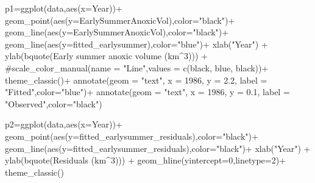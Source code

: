 \documentclass[
  letterpaper,
  DIV=11,
  numbers=noendperiod]{scrartcl}
\newenvironment{Shaded}{\begin{snugshade}}{\end{snugshade}}
\newcommand{\AttributeTok}[1]{\textcolor[rgb]{0.40,0.45,0.13}{#1}}
\newcommand{\CommentTok}[1]{\textcolor[rgb]{0.37,0.37,0.37}{#1}}
\newcommand{\DecValTok}[1]{\textcolor[rgb]{0.68,0.00,0.00}{#1}}
\newcommand{\FloatTok}[1]{\textcolor[rgb]{0.68,0.00,0.00}{#1}}
\newcommand{\FunctionTok}[1]{\textcolor[rgb]{0.28,0.35,0.67}{#1}}
\newcommand{\NormalTok}[1]{\textcolor[rgb]{0.00,0.23,0.31}{#1}}
\newcommand{\OtherTok}[1]{\textcolor[rgb]{0.00,0.23,0.31}{#1}}
\newcommand{\SpecialCharTok}[1]{\textcolor[rgb]{0.37,0.37,0.37}{#1}}
\newcommand{\StringTok}[1]{\textcolor[rgb]{0.13,0.47,0.30}{#1}}
\begin{document}
\begin{Shaded}
\begin{Highlighting}[]
\NormalTok{p1}\OtherTok{=}\FunctionTok{ggplot}\NormalTok{(data,}\FunctionTok{aes}\NormalTok{(}\AttributeTok{x=}\NormalTok{Year))}\SpecialCharTok{+}
  \FunctionTok{geom\_point}\NormalTok{(}\FunctionTok{aes}\NormalTok{(}\AttributeTok{y=}\NormalTok{EarlySummerAnoxicVol),}\AttributeTok{color=}\StringTok{"black"}\NormalTok{)}\SpecialCharTok{+}
  \FunctionTok{geom\_line}\NormalTok{(}\FunctionTok{aes}\NormalTok{(}\AttributeTok{y=}\NormalTok{EarlySummerAnoxicVol),}\AttributeTok{color=}\StringTok{"black"}\NormalTok{)}\SpecialCharTok{+}
  \FunctionTok{geom\_line}\NormalTok{(}\FunctionTok{aes}\NormalTok{(}\AttributeTok{y=}\NormalTok{fitted\_earlysummer),}\AttributeTok{color=}\StringTok{"blue"}\NormalTok{)}\SpecialCharTok{+}
  \FunctionTok{xlab}\NormalTok{(}\StringTok{"Year"}\NormalTok{) }\SpecialCharTok{+}
  \FunctionTok{ylab}\NormalTok{(}\FunctionTok{bquote}\NormalTok{(}\StringTok{\textquotesingle{}Early summer anoxic volume\textquotesingle{}}\NormalTok{ (km}\SpecialCharTok{\^{}}\DecValTok{3}\NormalTok{))) }\SpecialCharTok{+}
  \CommentTok{\#scale\_color\_manual(name = "Line",values = c(\textquotesingle{}black\textquotesingle{}, \textquotesingle{}blue\textquotesingle{}, \textquotesingle{}black\textquotesingle{}))+}
  \FunctionTok{theme\_classic}\NormalTok{()}\SpecialCharTok{+}
  \FunctionTok{annotate}\NormalTok{(}\AttributeTok{geom =} \StringTok{"text"}\NormalTok{, }\AttributeTok{x =} \DecValTok{1986}\NormalTok{, }\AttributeTok{y =} \FloatTok{2.2}\NormalTok{, }\AttributeTok{label =} \StringTok{"Fitted"}\NormalTok{,}\AttributeTok{color=}\StringTok{"blue"}\NormalTok{)}\SpecialCharTok{+}
  \FunctionTok{annotate}\NormalTok{(}\AttributeTok{geom =} \StringTok{"text"}\NormalTok{, }\AttributeTok{x =} \DecValTok{1986}\NormalTok{, }\AttributeTok{y =} \FloatTok{0.1}\NormalTok{, }\AttributeTok{label =} \StringTok{"Observed"}\NormalTok{,}\AttributeTok{color=}\StringTok{"black"}\NormalTok{)}
  
\NormalTok{p2}\OtherTok{=}\FunctionTok{ggplot}\NormalTok{(data,}\FunctionTok{aes}\NormalTok{(}\AttributeTok{x=}\NormalTok{Year))}\SpecialCharTok{+}
  \FunctionTok{geom\_point}\NormalTok{(}\FunctionTok{aes}\NormalTok{(}\AttributeTok{y=}\NormalTok{fitted\_earlysummer\_residuals),}\AttributeTok{color=}\StringTok{"black"}\NormalTok{)}\SpecialCharTok{+}
  \FunctionTok{geom\_line}\NormalTok{(}\FunctionTok{aes}\NormalTok{(}\AttributeTok{y=}\NormalTok{fitted\_earlysummer\_residuals),}\AttributeTok{color=}\StringTok{"black"}\NormalTok{)}\SpecialCharTok{+}
  \FunctionTok{xlab}\NormalTok{(}\StringTok{"Year"}\NormalTok{) }\SpecialCharTok{+}
  \FunctionTok{ylab}\NormalTok{(}\FunctionTok{bquote}\NormalTok{(}\StringTok{\textquotesingle{}Residuals\textquotesingle{}}\NormalTok{ (km}\SpecialCharTok{\^{}}\DecValTok{3}\NormalTok{))) }\SpecialCharTok{+}
  \FunctionTok{geom\_hline}\NormalTok{(}\AttributeTok{yintercept=}\DecValTok{0}\NormalTok{,}\AttributeTok{linetype=}\DecValTok{2}\NormalTok{)}\SpecialCharTok{+}
  \FunctionTok{theme\_classic}\NormalTok{()}


\end{Highlighting}
\end{Shaded}
\end{document}
